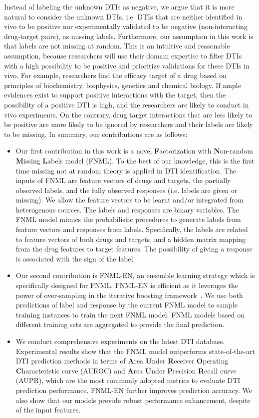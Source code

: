 \documentclass[journal]{IEEEtran}
\begin{document}
Instead of labeling the unknown DTIs as negative, we argue that it is more natural to consider the unknown DTIs, i.e. DTIs that are neither identified in vivo to be positive nor experimentally validated to be negative (non-interacting drug-target pairs), as missing labels. Furthermore, our assumption in this work is that labels are not missing at random. This is an intuitive and reasonable assumption, because researchers will use their domain expertise to filter DTIs with a high possibility to be positive and prioritize validations for these DTIs in vivo. For example, researchers find the efficacy target of a drug based on principles of biochemistry, biophysics, genetics and chemical biology. If ample evidences exist to support positive interactions with the target, then the possibility of a positive DTI is high, and the researchers are likely to conduct in vivo experiments. On the contrary, drug target interactions that are less likely to be positive are more likely to be ignored by researchers and their labels are likely to be missing. In summary, our contributions are as follows:
\begin{itemize}
    \item Our first contribution in this work is a novel \textbf{F}actorization with \textbf{N}on-random \textbf{M}issing \textbf{L}abels model (FNML). To the best of our knowledge, this is the first time missing not at random theory is applied in DTI identification. The inputs of FNML are feature vectors of drugs and targets, the partially observed labels, and the fully observed responses (i.e. labels are given or missing). We allow the feature vectors to be learnt and/or integrated from heterogenous sources. The labels and responses are binary variables. The FNML model mimics the probabilistic procedures to generate labels from feature vectors and responses from labels. Specifically, the labels are related to feature vectors of both drugs and targets, and a hidden matrix mapping from the drug features to target features. The possibility of giving a response is associated with the sign of the label.
    \item Our second contribution is FNML-EN, an ensemble learning strategy which is specifically designed for FNML. FNML-EN is efficient as it leverages the power of over-sampling in the iterative boosting framework~\cite{Boosting}. We use both predictions of label and response by the current FNML model to sample training instances to train the next FNML model.  FNML models based on different training sets are aggregated to provide the final prediction.
    \item We conduct comprehensive experiments on the latest DTI database. Experimental results show that the FNML model outperforms state-of-the-art DTI prediction methods in terms of \textbf{A}rea \textbf{U}nder \textbf{R}eceiver \textbf{O}perating \textbf{C}haracteristic curve (AUROC) and \textbf{A}rea \textbf{U}nder \textbf{P}recision \textbf{R}ecall curve (AUPR), which are the most commonly adopted metrics to evaluate DTI prediction performance. FNML-EN further improves prediction accuracy. We also show that our models provide robust performance enhancement, despite of the input features.
\end{itemize}
\end{document}
